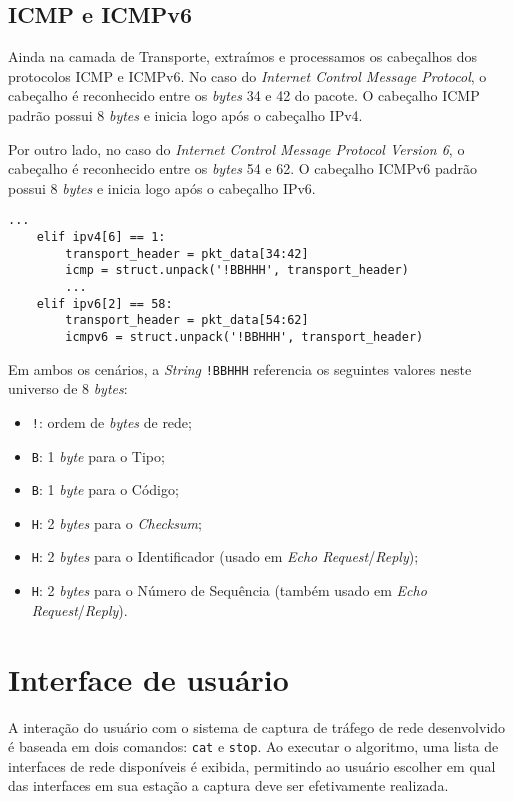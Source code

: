 \documentclass[12pt]{article}
\begin{document}
\subsection{ICMP e ICMPv6}
Ainda na camada de Transporte, extraímos e processamos os cabeçalhos dos protocolos ICMP e ICMPv6. No caso do \emph{Internet Control Message Protocol}, o cabeçalho é reconhecido entre os \emph{bytes} 34 e 42 do pacote. O cabeçalho ICMP padrão possui 8 \emph{bytes} e inicia logo após o cabeçalho IPv4.

\quad Por outro lado, no caso do \emph{Internet Control Message Protocol Version 6}, o cabeçalho é reconhecido entre os \emph{bytes} 54 e 62. O cabeçalho ICMPv6 padrão possui 8 \emph{bytes} e inicia logo após o cabeçalho IPv6.

\begin{lstlisting}[style=vscode]
...
    elif ipv4[6] == 1:
        transport_header = pkt_data[34:42]
        icmp = struct.unpack('!BBHHH', transport_header)
        ...
    elif ipv6[2] == 58:
        transport_header = pkt_data[54:62]
        icmpv6 = struct.unpack('!BBHHH', transport_header)
\end{lstlisting}

\quad Em ambos os cenários, a \emph{String} \texttt{!BBHHH} referencia os seguintes valores neste universo de 8 \emph{bytes}:

\begin{itemize}
    \item \texttt{!}: ordem de \emph{bytes} de rede;
    \item \texttt{B}: 1 \emph{byte} para o Tipo;
    \item \texttt{B}: 1 \emph{byte} para o Código;
    \item \texttt{H}: 2 \emph{bytes} para o \emph{Checksum};
    \item \texttt{H}: 2 \emph{bytes} para o Identificador (usado em \emph{Echo Request}/\emph{Reply});
    \item \texttt{H}: 2 \emph{bytes} para o Número de Sequência (também usado em \emph{Echo Request}/\emph{Reply}).
\end{itemize}

\section{Interface de usuário}
A interação do usuário com o sistema de captura de tráfego de rede desenvolvido é baseada em dois comandos: \texttt{cat} e \texttt{stop}. Ao executar o algoritmo, uma lista de interfaces de rede disponíveis é exibida, permitindo ao usuário escolher em qual das interfaces em sua estação a captura deve ser efetivamente realizada.
\end{document}
